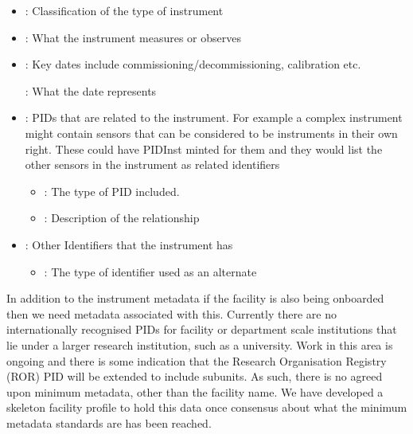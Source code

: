 \documentclass[letterpaper,10pt,english]{sphinxmanual}
\begin{document}
\begin{description}
\begin{itemize}
\item {} 
\sphinxAtStartPar
{}: Classification of the type of instrument

\item {} 
\sphinxAtStartPar
{}: What the instrument measures or observes

\item {} 
\sphinxAtStartPar
{}: Key dates include commissioning/decommissioning, calibration etc.

\sphinxAtStartPar
\sphinxhyphen{}: What the date represents

\item {} 
\sphinxAtStartPar
{}: PIDs that are related to the instrument. For example a complex instrument might contain sensors that can be considered to be instruments in their own right. These could have PIDInst minted for them and they would list the other sensors in the instrument as related identifiers
\begin{itemize}
\item {} 
\sphinxAtStartPar
{}: The type of PID included.

\item {} 
\sphinxAtStartPar
{}: Description of the relationship

\end{itemize}

\item {} 
\sphinxAtStartPar
{}: Other Identifiers that the instrument has
\begin{itemize}
\item {} 
\sphinxAtStartPar
{}: The type of identifier used as an alternate

\end{itemize}

\end{itemize}

\end{description}

\sphinxAtStartPar
In addition to the instrument metadata if the facility is also being onboarded then we need metadata associated with this. Currently there are no internationally recognised PIDs for facility or department scale institutions that lie under a larger research institution, such as a university. Work in this area is ongoing and there is some indication that the Research Organisation Registry (ROR) PID will be extended to include sub\sphinxhyphen{}units. As such, there is no agreed upon minimum metadata, other than the facility name. We have developed a skeleton facility profile to hold this data once consensus about what the minimum metadata standards are has been reached.
\end{document}
